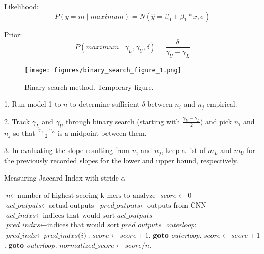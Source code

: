 \documentclass[runningheads]{llncs}
\begin{document}
Likelihood:
\begin{equation}\label{likelihoodequ}
    P(y=m \mid maximum) = N(\hat{y} = \beta_{0} + \beta_{1} * x, \sigma) 
\end{equation}

Prior:
\begin{equation}\label{priorequ}
    P(maximum \mid \gamma_{L}, \gamma_{U}, \delta) = \frac{\delta}{\gamma_{U} - \gamma_{L}}
\end{equation}

\begin{figure}[H]
    \centering
    \texttt{[image: figures/binary\_search\_figure\_1.png]}
    \setlength{\belowcaptionskip}{-15pt}
    \caption{Binary search method. Temporary figure.}
    \label{dnadigest}
\end{figure}

1. Run model 1 to $n$ to determine sufficient $\delta$ between $n_i$ and $n_j$ empirical. 

2. Track $\gamma_L$ and $\gamma_U$ through binary search (starting with $\frac{\gamma_{U} - \gamma_{L}}{2}$) and pick $n_i$ and $n_j$ so that $\frac{\gamma_{U} - \gamma_{L}}{2}$ is a midpoint between them.

3. In evaluating the slope resulting from $n_i$ and $n_j$, keep a list of $m_L$ and $m_U$ for the previously recorded slopes for the lower and upper bound, respectively.

\begin{algorithm}[H]
\caption{Measuring Jaccard Index with stride $\alpha$}\label{cnnscorestride}
\begin{algorithmic}[1]
\State $\textit{n} \gets \text{number of highest-scoring k-mers to analyze}$
\State $\textit{score} \gets 0$
\State $\textit{act\_outputs} \gets \text{actual outputs}$
\State $\textit{pred\_outputs} \gets \text{outputs from CNN}$
\State $\textit{act\_indxs} \gets \text{indices that would sort }\textit{act\_outputs}$
\State $\textit{pred\_indxs} \gets \text{indices that would sort } \textit{pred\_outputs}$ 
\BState \emph{outerloop}:
\State $\textit{pred\_indx} \gets \textit{pred\_indxs(i)}$.
\State $score \gets score+1$.
\State \textbf{goto} \emph{outerloop}.
\EndIf
{}
\State $score \gets score+1$.
\State \textbf{goto} \emph{outerloop}.
\EndIf
\EndFor
\EndFor
\State $normalized\_score \gets score / n$.
\EndProcedure
\end{algorithmic}
\end{algorithm}
\end{document}
